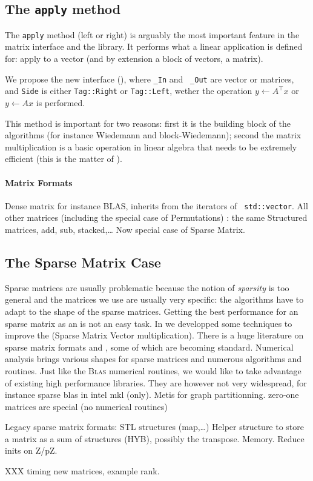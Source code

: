 \subsection{The \texttt{apply} method}
%
%
\par
%
The \texttt{apply} method (left or right) is arguably the most important
feature in the matrix interface and the \linbox library. It performs what a
linear application is defined for: apply to a vector (and by extension  a block
of vectors, \ie a matrix).
%
\par
%
We propose the new interface (), where {\tt \_In} and {\tt
\_Out} are vector or matrices, and {\tt Side} is either {\tt Tag::Right} or
{\tt Tag::Left}, wether the operation $y \gets A^{\top} x$ or  $y \gets A x$ is
performed.
%

%
This method is important for two reasons: first it is the building block of the
\applin algorithms (for instance Wiedemann and block-Wiedemann); second the
matrix multiplication is a basic operation in linear algebra that needs to be
extremely efficient (this is the matter of ).
%
%
%
\paragraph{Matrix Formats}
Dense matrix for instance BLAS, inherits from the iterators of {\tt
std::vector}.
%
All other matrices (including the special case of Permutations) : the same
Structured matrices, add, sub, stacked,\dots
%
Now special case of Sparse Matrix.
%
\subsection{The Sparse Matrix Case}
%
Sparse matrices are usually problematic because the notion of \emph{sparsity}
is too general and the matrices we use are usually very specific: the
algorithms have to adapt to the shape of the sparse matrices.  Getting the best
performance for an sparse matrix as an \applin is not an easy task. In
\cite{Boyer:2010:spmv} we developped some techniques to improve the \spmv
(Sparse Matrix Vector multiplication). There is a huge literature on sparse
matrix formats and \spmv, some of which are becoming standard. Numerical
analysis brings various shapes for sparse matrices and numerous algorithms and
routines.  Just like the \textsc{Blas} numerical routines, we would like to
take advantage of existing high performance libraries. They are however not
very widespread, for instance sparse blas in intel mkl (only). Metis for graph
partitionning.  zero-one matrices are special (no numerical routines)
%
\par
%
Legacy \linbox sparse matrix formats: STL structures (map,\ldots)
%
Helper structure to store a matrix as a sum of structures (HYB), possibly the
transpose. Memory.  Reduce inits on Z/pZ.
%
\par
%
%
\par
%
XXX timing new matrices, example rank.
%
%

